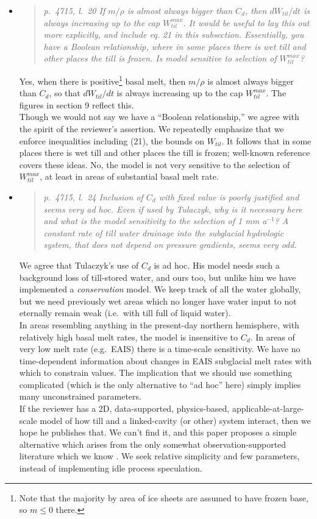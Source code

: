 \documentclass[11pt,reqno]{amsart}
\newcommand{\reply}[2]{
\medskip\medskip
\item  \begin{quote}
\emph{#1}
\end{quote}

\medskip
\noindent #2}
\begin{document}
\begin{itemize}
\reply{p.~4715, l.~20 If $m/\rho$ is almost always bigger than $C_d$, then $dW_{til}/dt$ is always increasing up to the cap $W_{til}^{max}$. It would be useful to lay this out more explicitly, and include eq. 21 in this subsection. Essentially, you have a Boolean relationship, where in some places there is wet till and other places the till is frozen. Is model sensitive to selection of $W_{til}^{max}$?}
{Yes, when there is positive\footnote{Note that the majority by area of ice sheets are assumed to have frozen base, so $m\le 0$ there.} basal melt, then $m/\rho$ is almost always bigger than $C_d$, so that $dW_{til}/dt$ is always increasing up to the cap $W_{til}^{max}$.  The figures in section 9 reflect this. \\
\indent Though we would not say we have a ``Boolean relationship,'' we agree with the spirit of the reviewer's assertion.  We repeatedly emphasize that we enforce inequalities including (21), the bounds on $W_{til}$.  It follows that in some places there is wet till and other places the till is frozen; well-known reference \cite{BBssasliding} covers these ideas.  No, the model is not very sensitive to the selection of $W_{til}^{max}$, at least in areas of substantial basal melt rate.}

\reply{p.~4715, l.~24 Inclusion of $C_d$ with fixed value is poorly justified and seems very ad hoc.  Even if used by Tulaczyk, why is it necessary here and what is the model sensitivity to the selection of 1 mm a$^{-1}$?  A constant rate of till water drainage into the subglacial hydrologic system, that does not depend on pressure gradients, seems very odd.}
{We agree that Tulaczyk's \cite{Tulaczyketal2000} use of $C_d$ is ad hoc.  His model needs such a background loss of till-stored water, and ours too, but unlike him we have implemented a \emph{conservation} model.  We keep track of all the water globally, but we need previously wet areas which no longer have water input to not eternally remain weak (i.e.~with till full of liquid water).\\
\indent In areas resembling anything in the present-day northern hemisphere, with relatively high basal melt rates, the model is insensitive to $C_d$.  In areas of very low melt rate (e.g.~EAIS) there is a time-scale sensitivity.  We have no time-dependent information about changes in EAIS subglacial melt rates with which to constrain values.  The implication that we should use something complicated (which is the only alternative to ``ad hoc'' here) simply implies many unconstrained parameters. \\
\indent If the reviewer has a 2D, data-supported, physics-based, applicable-at-large-scale model of how till and a linked-cavity (or other) system interact, then we hope he publishes that.  We can't find it, and this paper proposes a simple alternative which arises from the only somewhat observation-supported literature which we know \cite{Tulaczyketal2000}.  We seek relative simplicity and few parameters, instead of implementing idle process speculation.}


\end{itemize}
\end{document}
